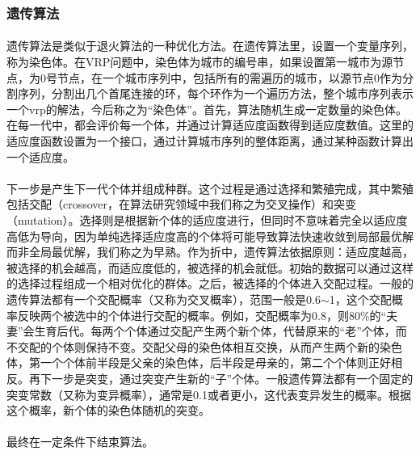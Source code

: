 \documentclass[UTF8,a4paper]{ctexart}
\begin{document}
\subsubsection{遗传算法\label{sec:ga}}
\paragraph{}遗传算法是类似于退火算法的一种优化方法。在遗传算法里，设置一个变量序列，称为染色体。在VRP问题中，染色体为城市的编号串，如果设置第一城市为源节点，为0号节点，在一个城市序列中，包括所有的需遍历的城市，以源节点0作为分割序列，分割出几个首尾连接的环，每个环作为一个遍历方法，整个城市序列表示一个vrp的解法，今后称之为“染色体”。首先，算法随机生成一定数量的染色体。在每一代中，都会评价每一个体，并通过计算适应度函数得到适应度数值。这里的适应度函数设置为一个接口，通过计算城市序列的整体距离，通过某种函数计算出一个适应度。

\paragraph{}下一步是产生下一代个体并组成种群。这个过程是通过选择和繁殖完成，其中繁殖包括交配（crossover，在算法研究领域中我们称之为交叉操作）和突变（mutation）。选择则是根据新个体的适应度进行，但同时不意味着完全以适应度高低为导向，因为单纯选择适应度高的个体将可能导致算法快速收敛到局部最优解而非全局最优解，我们称之为早熟。作为折中，遗传算法依据原则：适应度越高，被选择的机会越高，而适应度低的，被选择的机会就低。初始的数据可以通过这样的选择过程组成一个相对优化的群体。之后，被选择的个体进入交配过程。一般的遗传算法都有一个交配概率（又称为交叉概率），范围一般是0.6$\sim$1，这个交配概率反映两个被选中的个体进行交配的概率。例如，交配概率为0.8，则80\%的“夫妻”会生育后代。每两个个体通过交配产生两个新个体，代替原来的“老”个体，而不交配的个体则保持不变。交配父母的染色体相互交换，从而产生两个新的染色体，第一个个体前半段是父亲的染色体，后半段是母亲的，第二个个体则正好相反。再下一步是突变，通过突变产生新的“子”个体。一般遗传算法都有一个固定的突变常数（又称为变异概率），通常是0.1或者更小，这代表变异发生的概率。根据这个概率，新个体的染色体随机的突变。
\paragraph{}最终在一定条件下结束算法。
\end{document}
